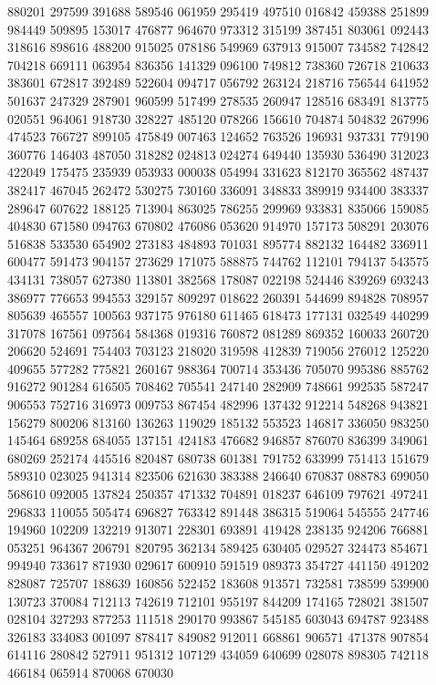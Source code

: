 {880201 297599 391688 589546 061959 295419 497510 016842 459388 251899 984449%
509895 153017 476877 964670 973312 315199 387451 803061 092443 318616 898616%
488200 915025 078186 549969 637913 915007 734582 742842 704218 669111 063954%
836356 141329 096100 749812 738360 726718 210633 383601 672817 392489 522604%
094717 056792 263124 218716 756544 641952 501637 247329 287901 960599 517499%
278535 260947 128516 683491 813775 020551 964061 918730 328227 485120 078266%
156610 704874 504832 267996 474523 766727 899105 475849 007463 124652 763526%
196931 937331 779190 360776 146403 487050 318282 024813 024274 649440 135930%
536490 312023 422049 175475 235939 053933 000038 054994 331623 812170 365562%
487437 382417 467045 262472 530275 730160 336091 348833 389919 934400 383337%
289647 607622 188125 713904 863025 786255 299969 933831 835066 159085 404830%
671580 094763 670802 476086 053620 914970 157173 508291 203076 516838 533530%
654902 273183 484893 701031 895774 882132 164482 336911 600477 591473 904157%
273629 171075 588875 744762 112101 794137 543575 434131 738057 627380 113801%
382568 178087 022198 524446 839269 693243 386977 776653 994553 329157 809297%
018622 260391 544699 894828 708957 805639 465557 100563 937175 976180 611465%
618473 177131 032549 440299 317078 167561 097564 584368 019316 760872 081289%
869352 160033 260720 206620 524691 754403 703123 218020 319598 412839 719056%
276012 125220 409655 577282 775821 260167 988364 700714 353436 705070 995386%
885762 916272 901284 616505 708462 705541 247140 282909 748661 992535 587247%
906553 752716 316973 009753 867454 482996 137432 912214 548268 943821 156279%
800206 813160 136263 119029 185132 553523 146817 336050 983250 145464 689258%
684055 137151 424183 476682 946857 876070 836399 349061 680269 252174 445516%
820487 680738 601381 791752 633999 751413 151679 589310 023025 941314 823506%
621630 383388 246640 670837 088783 699050 568610 092005 137824 250357 471332%
704891 018237 646109 797621 497241 296833 110055 505474 696827 763342 891448%
386315 519064 545555 247746 194960 102209 132219 913071 228301 693891 419428%
238135 924206 766881 053251 964367 206791 820795 362134 589425 630405 029527%
324473 854671 994940 733617 871930 029617 600910 591519 089373 354727 441150%
491202 828087 725707 188639 160856 522452 183608 913571 732581 738599 539900%
130723 370084 712113 742619 712101 955197 844209 174165 728021 381507 028104%
327293 877253 111518 290170 993867 545185 603043 694787 923488 326183 334083%
001097 878417 849082 912011 668861 906571 471378 907854 614116 280842 527911%
951312 107129 434059 640699 028078 898305 742118 466184 065914 870068 670030%
}
